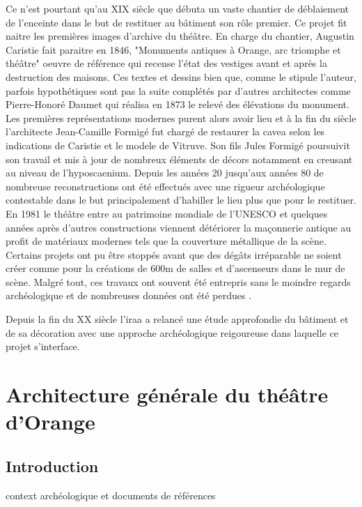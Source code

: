 			 Ce n'est pourtant qu'au XIX siècle que débuta un vaste chantier de déblaiement de l'enceinte dans le but de restituer au bâtiment son rôle premier. Ce projet fit naitre les premières images d'archive du théâtre. En charge du chantier, Augustin Caristie fait paraitre en 1846, "Monuments antiques à Orange, arc triomphe et théâtre" oeuvre de référence qui recense l'état des vestiges avant et après la destruction des maisons. Ces textes et dessins bien que, comme le stipule l'auteur, parfois hypothétiques sont pas la suite complétés par d'autres architectes comme Pierre-Honoré Daumet qui réalisa en 1873 le relevé des élévations du monument. Les premières représentations modernes purent alors avoir lieu et à la fin du siècle l'architecte Jean-Camille Formigé fut chargé de restaurer la cavea selon les indications de Caristie et le modele de Vitruve. Son fils Jules Formigé poursuivit son travail et mis à jour de nombreux éléments de décors notamment en creusant au niveau de l'\gls{hyposcaenium}. Depuis les années 20 jusqu'aux années 80 de nombreuse reconstructions ont été effectués avec une rigueur archéologique contestable dans le but principalement d'habiller le lieu plus que pour le restituer. En 1981 le théâtre entre au patrimoine mondiale de l'UNESCO et quelques années après d'autres constructions viennent détériorer la maçonnerie antique au profit de matériaux modernes tels que la couverture métallique de la scène. Certains projets ont pu être stoppés avant que des dégâts irréparable ne soient créer comme pour la créations de 600m de salles et d'ascenseurs dans le mur de scène. Malgré tout, ces travaux ont souvent été entrepris sans le moindre regards archéologique et de nombreuses données ont été perdues \citep{carteArcheo}.
			 
			 Depuis la fin du XX siècle l'\gls{iraa} a relancé une étude approfondie du bâtiment et de sa décoration avec une approche archéologique reigoureuse dans laquelle ce projet s'interface.


	\chapter{Architecture générale du théâtre d'Orange}
		\minitoc
		\newpage
		
		\section{Introduction}
		context archéologique et documents de références
		
